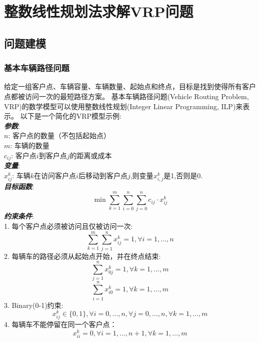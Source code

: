 \section{整数线性规划法求解VRP问题}

\subsection{问题建模}

\subsubsection{基本车辆路径问题}
    给定一组客户点、车辆容量、车辆数量、起始点和终点，目标是找到使得所有客户点都被访问一次的最短路径方案。
    基本车辆路径问题(Vehicle Routing Problem, VRP)的数学模型可以使用整数线性规划(Integer Linear Programming, ILP)来表示。
    以下是一个简化的VRP模型示例:\\
    \textbf{\textit{参数}}:\\
    $n$: 客户点的数量（不包括起始点）\\
    $m$: 车辆的数量\\
    $c_{ij}$: 客户点$i$到客户点$j$的距离或成本\\
    \textbf{\textit{变量}}:\\
    $x_{ij}^{k}$: 车辆$k$在访问客户点$i$后移动到客户点$j$,则变量$x_{i,j}^k$是1,否则是0.\\
    \textbf{\textit{目标函数}}:
    \[\min\sum_{k=1}^{m}\sum_{i=0}^{n}\sum_{j=0}^{n}c_{ij}\cdot x_{ij}^{k}\]
    \textbf{\textit{约束条件}}:\\
    1. 每个客户点必须被访问且仅被访问一次:
    \[\sum_{k=1}^{m}\sum_{j=1}^{n}x_{ij}^{k} = 1, \forall i = 1, \dots, n\]
    2. 每辆车的路径必须从起始点开始，并在终点结束:
    \[\sum_{j = 1}^{n}x_{0j}^{k} = 1, \forall k = 1, \dots, m\]
    \[\sum_{i = 1}^{n}x_{i0}^{k} = 1, \forall k = 1, \dots, m\]
    3. Binary(0-1)约束:
    \[x_{ij}^{k}\in \{0, 1\}, \forall i = 0, \dots, n, \forall j = 0, \dots, n, \forall k = 1, \dots, m\]
    4. 每辆车不能停留在同一个客户点：
    \[x_{ii}^k = 0, \forall i = 1, \dots, n+1, \forall k = 1, \dots, m\]
